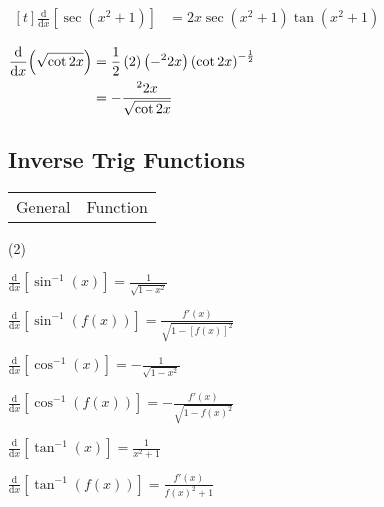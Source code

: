 \documentclass[11pt,a4paper]{book}
\let\csc\relax
\DeclareMathOperator{\csc}{cosec}
\begin{document}
\begin{example}
\begin{tasks}[label=(\alph*),label-width=3.5ex]
\task
$
\begin{aligned}[t]
{\displaystyle \frac{\mathrm{d}}{\mathrm{d}x}\left[{\displaystyle \sec\left(x^{2}+1\right)}\right]} & =2x\sec\left(x^{2}+1\right)\tan\left(x^{2}+1\right)
\end{aligned}
$

\task
$
\begin{aligned}[t]
{\displaystyle \frac{\mathrm{d}}{\mathrm{d}x}{\displaystyle \left(\sqrt{\cot2x}\right)}} & =\frac{1}{2}\left(2\right)\left(-\csc^{2}2x\right)\left(\cot2x\right)^{-\frac{1}{2}}\\
 & =-\frac{\csc^{2}2x}{\sqrt{\cot2x}}
\end{aligned}
$

\end{tasks}

\end{example}

\newpage

\subsection{Inverse Trig Functions}

\begin{tcolorbox}[colback=blue!5, colframe=black, boxrule=.4pt, sharpish corners]


\begin{tabular}{>{\centering}p{4.5cm}>{\centering}p{10cm}}
General & Function\tabularnewline
\end{tabular}

\begin{tasks}[style=itemize,label-width=3.5ex,column-sep=-1cm](2)

\task  ${\displaystyle \frac{\mathrm{d}}{\mathrm{d}x}\left[\sin^{-1}\left(x\right)\right]=\frac{1}{\sqrt{1-x^{2}}}}$

\task ${\displaystyle \frac{\mathrm{d}}{\mathrm{d}x}\left[\sin^{-1}\left(f(x)\right)\right]=\frac{f'(x)}{\sqrt{1-\left[f(x)\right]^{2}}}}$

\task  ${\displaystyle \frac{\mathrm{d}}{\mathrm{d}x}\left[\cos^{-1}\left(x\right)\right]=-\frac{1}{\sqrt{1-x^{2}}}}$

\task  ${\displaystyle \frac{\mathrm{d}}{\mathrm{d}x}\left[\cos^{-1}\left(f(x)\right)\right]=-\frac{f'(x)}{\sqrt{1-f(x)^{2}}}}$

\task  ${\displaystyle \frac{\mathrm{d}}{\mathrm{d}x}\left[\tan^{-1}\left(x\right)\right]=\frac{1}{x^{2}+1}}$

\task  ${\displaystyle \frac{\mathrm{d}}{\mathrm{d}x}\left[\tan^{-1}\left(f(x)\right)\right]=\frac{f'(x)}{f(x)^{2}+1}}$

\end{tasks}
\end{tcolorbox}
\end{document}
